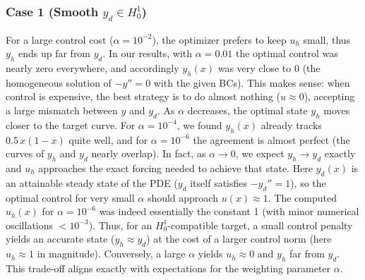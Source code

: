 \documentclass{article}
\begin{document}
\subsubsection{Case 1 (Smooth $y_d \in H^1_0$)}
For a large control cost ($\alpha=10^{-2}$), the optimizer prefers to keep $u_h$ small, thus $y_h$ ends up far from $y_d$. In our results, with $\alpha=0.01$ the optimal control was nearly zero everywhere, and accordingly $y_h(x)$ was very close to 0 (the homogeneous solution of $-y''=0$ with the given BCs). This makes sense: when control is expensive, the best strategy is to do almost nothing ($u\approx0$), accepting a large mismatch between $y$ and $y_d$. As $\alpha$ decreases, the optimal state $y_h$ moves closer to the target curve. For $\alpha=10^{-4}$, we found $y_h(x)$ already tracks $0.5\,x(1-x)$ quite well, and for $\alpha=10^{-6}$ the agreement is almost perfect (the curves of $y_h$ and $y_d$ nearly overlap). In fact, as $\alpha\to 0$, we expect $y_h\to y_d$ exactly and $u_h$ approaches the exact forcing needed to achieve that state. Here $y_d(x)$ is an attainable steady state of the PDE ($y_d$ itself satisfies $-y_d'' = 1$), so the optimal control for very small $\alpha$ should approach $u(x)\approx 1$. The computed $u_h(x)$ for $\alpha=10^{-6}$ was indeed essentially the constant 1 (with minor numerical oscillations $<10^{-3}$). Thus, for an $H^1_0$-compatible target, a small control penalty yields an accurate state ($y_h \approx y_d$) at the cost of a larger control norm (here $u_h\approx 1$ in magnitude). Conversely, a large $\alpha$ yields $u_h\approx 0$ and $y_h$ far from $y_d$. This trade-off aligns exactly with expectations for the weighting parameter $\alpha$.
\end{document}
